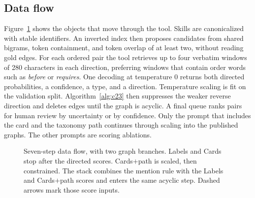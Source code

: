 \documentclass{ws-ijait}
\begin{document}
\subsection{Data flow}
Figure~\ref{fig:pipeline} shows the objects that move through the
tool.
Skills are canonicalized with stable identifiers.
An inverted index then proposes candidates from shared bigrams,
token containment, and token overlap of at least two, without
reading gold edges.
For each ordered pair the tool retrieves up to four verbatim
windows of 280 characters in each direction, preferring windows
that contain order words such as \emph{before} or
\emph{requires}.
One decoding at temperature $0$ returns both directed probabilities,
a confidence, a type, and a direction.
Temperature scaling\cite{Guo_2017} is fit on the validation split.
Algorithm~\ref{alg:c23} then suppresses the weaker reverse direction
and deletes edges until the graph is acyclic.
A final queue ranks pairs for human review by uncertainty or by
confidence.
Only the prompt that includes the card and the taxonomy path
continues through scaling into the published graphs.
The other prompts are scoring ablations.

\begin{figure}[th]
\centering
{}
\caption{Seven-step data flow, with two graph branches.
Labels and Cards stop after the directed scores.
Cards$+$path is scaled, then constrained.
The stack combines the mention rule with the Labels and
Cards$+$path scores and enters the same acyclic step.
Dashed arrows mark those score inputs.}
\label{fig:pipeline}
\end{figure}
\end{document}
